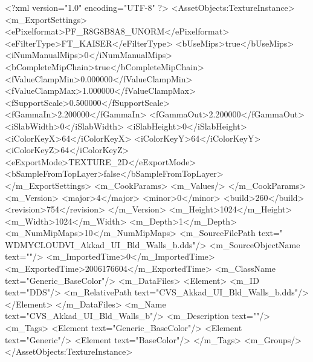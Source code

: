 <?xml version="1.0" encoding="UTF-8" ?>
<AssetObjects:TextureInstance>
	<m_ExportSettings>
		<ePixelformat>PF_R8G8B8A8_UNORM</ePixelformat>
		<eFilterType>FT_KAISER</eFilterType>
		<bUseMips>true</bUseMips>
		<iNumManualMips>0</iNumManualMips>
		<bCompleteMipChain>true</bCompleteMipChain>
		<fValueClampMin>0.000000</fValueClampMin>
		<fValueClampMax>1.000000</fValueClampMax>
		<fSupportScale>0.500000</fSupportScale>
		<fGammaIn>2.200000</fGammaIn>
		<fGammaOut>2.200000</fGammaOut>
		<iSlabWidth>0</iSlabWidth>
		<iSlabHeight>0</iSlabHeight>
		<iColorKeyX>64</iColorKeyX>
		<iColorKeyY>64</iColorKeyY>
		<iColorKeyZ>64</iColorKeyZ>
		<eExportMode>TEXTURE_2D</eExportMode>
		<bSampleFromTopLayer>false</bSampleFromTopLayer>
	</m_ExportSettings>
	<m_CookParams>
		<m_Values/>
	</m_CookParams>
	<m_Version>
		<major>4</major>
		<minor>0</minor>
		<build>260</build>
		<revision>754</revision>
	</m_Version>
	<m_Height>1024</m_Height>
	<m_Width>1024</m_Width>
	<m_Depth>1</m_Depth>
	<m_NumMipMaps>10</m_NumMipMaps>
	<m_SourceFilePath text="\\WDMYCLOUD\Sam\Projects\Modding\Civ VI\Civilizations\Akkad\Assets\Textures\CVS_Akkad_UI_Bld_Walls_b.dds"/>
	<m_SourceObjectName text=""/>
	<m_ImportedTime>0</m_ImportedTime>
	<m_ExportedTime>2006176604</m_ExportedTime>
	<m_ClassName text="Generic_BaseColor"/>
	<m_DataFiles>
		<Element>
			<m_ID text="DDS"/>
			<m_RelativePath text="CVS_Akkad_UI_Bld_Walls_b.dds"/>
		</Element>
	</m_DataFiles>
	<m_Name text="CVS_Akkad_UI_Bld_Walls_b"/>
	<m_Description text=""/>
	<m_Tags>
		<Element text="Generic_BaseColor"/>
		<Element text="Generic"/>
		<Element text="BaseColor"/>
	</m_Tags>
	<m_Groups/>
</AssetObjects:TextureInstance>

 